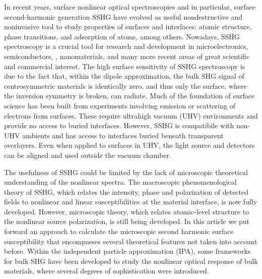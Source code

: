 \documentclass[floatfix,prb,aps,superscriptaddress,11pt,preprint,letterpaper]{revtex4}
\begin{document}
In recent years, surface nonlinear optical spectroscopies and in 
particular, surface second-harmonic generation SSHG have evolved as useful 
nondestructive and noninvasive tool to study properties of surfaces 
and interfaces: atomic structure, phase transitions, and adsorption of 
atoms, among others.\cite{
    daumPRL93, 
    mcgilpOE94, 
    meyerPRL95, 
    powerPRL95, 
    godefroyAPL96, 
    hoferAPA96, 
    dadapPRB97, 
    bloembergenAPB99, 
    mcgilpSRL99, 
    suzukiAPB99, 
    mitchellSS01,
    hughesPRB96, 
    guyot-sionnestPRB88, 
    downerPSSA01, 
    shenAPB99, 
    shenNAT89, 
    chenPRL81, 
    mendozaPRL98,
    downerSIA01,
    cazzanelliNM14}
Nowadays, SSHG spectroscopy is a crucial tool for research and development
in microelectronics,\cite{zheltikovLP00} semiconductors,
\cite{lupkeSSR99}, nanomaterials,\cite{salazar-aparicioPRB14} 
and many more recent 
areas of great scientific and commercial interest.\cite{cazzanelliNM14}
The high surface sensitivity of SSHG spectroscopy is due to the
fact that, within the dipole approximation, the bulk SHG signal of
centrosymmetric materials is identically zero, and thus only the
surface, where the inversion symmetry is broken, can radiate. 
Much of the foundation of surface science has been built from
experiments involving emission or scattering of electrons from
surfaces. These require ultrahigh vacuum (UHV) environments and
provide no access to buried interfaces. 
However, SSHG
is compatibile with non-UHV ambients and has access to
interfaces buried beneath transparent overlayers. Even when applied to
surfaces in UHV, the light source and detectors can be aligned and
used outside the vacuum chamber. 

The usefulness of SSHG could be limited by
the lack of microscopic theoretical
understanding of the nonlinear spectra. The macroscopic
phenomenological theory of SSHG, which relates the intensity,
phase and polarization of detected fields to nonlinear and linear
susceptibilities at the material interface, is now fully developed. 
However, microscopic theory, which relates atomic-level structure to
the nonlinear source polarization, is still being developed.
In this article we put forward an approach to calculate the
microscopic second harmonic surface susceptibility that encompasses several
theoretical features not taken into account before. 
Within the independent particle approximation (IPA),  
some frameworks for bulk SHG have been developed to study the 
nonlinear optical response of bulk materials, where several degrees of
sophistication were 
introduced.\cite{butcherPOPS63,aspnesPRB72,sipePRB93,levinePRB94,aversaPRB95,hughesPRB96,rashkeevPRB98} 
\end{document}
